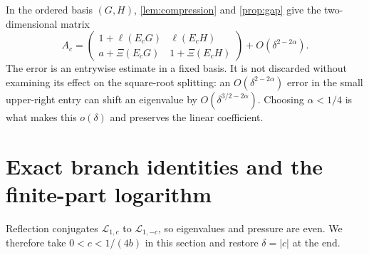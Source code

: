 \documentclass[11pt,a4paper]{article}
\numberwithin{equation}{section}
\theoremstyle{definition}
\theoremstyle{remark}
\newcommand{\Lop}{\mathcal L}
\begin{document}
In the ordered basis $(G,H)$, \cref{lem:compression} and
\cref{prop:gap} give the two-dimensional matrix
\begin{equation}
 A_c=\begin{pmatrix}
 1+\ell(E_cG)&\ell(E_cH)\\
 a+\Xi(E_cG)&1+\Xi(E_cH)
 \end{pmatrix}+O(\delta^{2-2\alpha}).
 \label{eq:central-matrix}
\end{equation}
The error is an entrywise estimate in a fixed basis. It is not discarded
without examining its effect on the square-root splitting: an
$O(\delta^{2-2\alpha})$ error in the small upper-right entry can shift
an eigenvalue by $O(\delta^{3/2-2\alpha})$. Choosing $\alpha<1/4$ is what
makes this $o(\delta)$ and preserves the linear coefficient.

\section{Exact branch identities and the finite-part logarithm}
\label{sec:response}
Reflection conjugates $\Lop_{1,c}$ to $\Lop_{1,-c}$, so eigenvalues and
pressure are even. We therefore take $0<c<1/(4b)$ in this section and
restore $\delta=|c|$ at the end.
\end{document}
